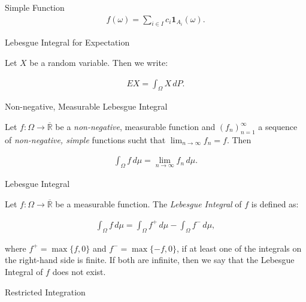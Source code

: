\documentclass[10pt,landscape]{article}
\newcommand{\Indicator}[1]{\mathbf{1}_{#1}}
\begin{document}
\begin{multicols}{3}
\begin{definition}{}{Simple Function}
        \begin{align*}
            f(\omega) = \sum_{i \in I} c_i \Indicator{A_i}(\omega).
        \end{align*}

\end{definition}

\begin{definition}{}{Lebesgue Integral for Expectation}

    Let $X$ be a random variable. Then we write:

        \begin{align*}
            EX = \int_{\Omega} X \,dP.
        \end{align*}

\end{definition}

\begin{definition}{}{Non-negative, Measurable Lebesgue Integral}

    Let $f: \Omega \to \overline{\mathbb{R}}$ be a \emph{non-negative}, measurable function and $(f_n)_{n=1}^{\infty}$ a sequence of \emph{non-negative, simple} functions sucht that $\lim_{n \to \infty} f_n = f$. Then

        \begin{align*}
            \int_{\Omega} f \, d\mu = \lim_{n \to \infty} f_n \, d\mu.
        \end{align*}

\end{definition}

\begin{definition}{}{Lebesgue Integral}

     Let $f: \Omega \to \overline{\mathbb{R}}$ be a measurable function. The \emph{Lebesgue Integral} of $f$ is defined as:

        \begin{align*}
            \int_{\Omega} f \,d\mu = \int_{\Omega} f^+ \,d\mu - \int_{\Omega} f^- \,d\mu,
        \end{align*}

    where $f^+ = \max\{f, 0\}$ and $f^-=\max\{-f, 0\}$, if at least one of the integrals on the right-hand side is finite. If both are infinite, then we say that the Lebesgue Integral of $f$ does not exist.

\end{definition}

\begin{definition}{}{Restricted Integration}


\end{definition}
\end{multicols}
\end{document}
